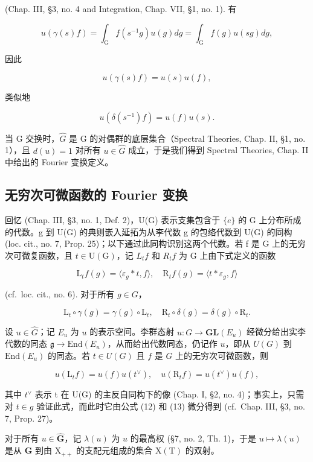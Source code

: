 (Chap. III, §3, no. 4 and Integration, Chap. VII, §1, no. 1). 有

\[
u (\gamma (s) f) = \int_ {\mathrm{G}} f (s ^ {- 1} g) u (g) d g = \int_ {\mathrm{G}} f (g) u (s g) d g,
\]

因此

\[
u (\gamma (s) f) = u (s) u (f),\tag{12}
\]

类似地

\[
u (\delta (s ^ {- 1}) f) = u (f) u (s).\tag{13}
\]

当 G 交换时，\(\hat{G}\) 是 G 的对偶群的底层集合（Spectral Theories, Chap. II, §1, no. 1），且 \(d(u) = 1\) 对所有 \(u \in \hat{G}\) 成立，于是我们得到 Spectral Theories, Chap. II 中给出的 Fourier 变换定义。

\subsection{无穷次可微函数的 Fourier 变换}

回忆 (Chap. III, §3, no. 1, Def. 2)，U(G) 表示支集包含于 \(\{e\}\) 的 G 上分布所成的代数。g 到 U(G) 的典则嵌入延拓为从李代数 g 的包络代数到 U(G) 的同构 (loc. cit., no. 7, Prop. 25)；以下通过此同构识别这两个代数。若 f 是 G 上的无穷次可微复函数，且 \(t \in \mathrm{U}(\mathrm{G})\)，记 \(L_{t}f\) 和 \(R_{t}f\) 为 G 上由下式定义的函数

\[
\mathrm{L} _ {t} f (g) = \langle \varepsilon_ {g} * t, f \rangle , \quad \mathrm{R} _ {t} f (g) = \langle t * \varepsilon_ {g}, f \rangle
\]

(cf.~loc. cit., no. 6). 对于所有 \(g \in G\)，

\[
\mathrm{L} _ {t} \circ \gamma (g) = \gamma (g) \circ \mathrm{L} _ {t}, \quad \mathrm{R} _ {t} \circ \delta (g) = \delta (g) \circ \mathrm{R} _ {t}.
\]

设 \(u \in \hat{G}\)；记 \(E_u\) 为 \(u\) 的表示空间。李群态射 \(u: G \to \mathbf{GL}(E_u)\) 经微分给出实李代数的同态 \(\mathfrak{g} \to \text{End}(E_u)\)，从而给出代数同态，仍记作 \(u\)，即从 \(U(G)\) 到 \(\text{End}(E_u)\) 的同态。若 \(t \in U(G)\) 且 \(f\) 是 \(G\) 上的无穷次可微函数，则

\[
u (\mathrm{L} _ {t} f) = u (f) u (t ^ {\vee}), \quad u (\mathrm{R} _ {t} f) = u (t ^ {\vee}) u (f),\tag{14}
\]

其中 \(t^{\vee}\) 表示 t 在 U(G) 的主反自同构下的像 (Chap. I, §2, no. 4)；事实上，只需对 \(t \in g\) 验证此式，而此时它由公式 (12) 和 (13) 微分得到 (cf.~Chap. III, §3, no. 7, Prop. 27)。

对于所有 \(u \in \hat{\mathbf{G}}\)，记 \(\lambda(u)\) 为 \(u\) 的最高权 (§7, no. 2, Th. 1)，于是 \(u \mapsto \lambda(u)\) 是从 \(\hat{\mathbf{G}}\) 到由 \(\mathrm{X}_{++}\) 的支配元组成的集合 \(\mathrm{X}(\mathrm{T})\) 的双射。

